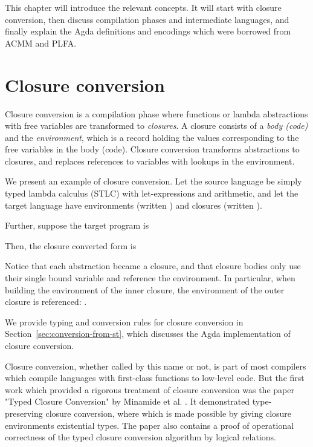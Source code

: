 \documentclass[bsc,frontabs,oneside,singlespacing,parskip,deptreport]{infthesis}
\theoremstyle{definition}
\theoremstyle{lemma}
\begin{document}
This chapter will introduce the relevant concepts. It will start with
closure conversion, then discuss compilation phases and intermediate
languages, and finally explain the Agda definitions and encodings
which were borrowed from ACMM and PLFA.

\section{Closure conversion}
\label{sec:closure-conversion}

Closure conversion is a compilation phase where functions or lambda
abstractions with free variables are transformed to
\textit{closures}. A closure consists of a \textit{body (code)} and
the \textit{environment}, which is a record holding the values
corresponding to the free variables in the body (code). Closure
conversion transforms abstractions to closures, and replaces
references to variables with lookups in the environment.

We present an example of closure conversion. Let the source language
be simply typed lambda calculus (STLC) with let-expressions and
arithmetic, and let the target language have environments (written
) and closures (written ).

Further, suppose the target program is


Then, the closure converted form is


Notice that each abstraction became a closure, and that closure bodies
only use their single bound variable and reference the environment. In
particular, when building the environment of the inner closure, the
environment of the outer closure is referenced: .

We provide typing and conversion rules for closure conversion in
Section~\ref{sec:conversion-from-st}, which discusses the Agda
implementation of closure conversion.

Closure conversion, whether called by this name or not, is part of
most compilers which compile languages with first-class functions to
low-level code. But the first work which provided a rigorous treatment
of closure conversion was the paper "Typed Closure Conversion" by
Minamide et al. \cite{TODO}. It demonstrated type-preserving closure
conversion, where which is made possible by giving closure
environments existential types. The paper also contains a proof of
operational correctness of the typed closure conversion algorithm by
logical relations.
\end{document}
